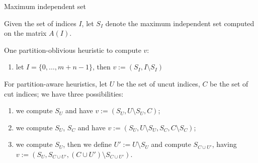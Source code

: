 \begin{frame}{Maximum independent set}

	Given the set of indices $I$, let $S_I$ denote the maximum independent set computed on the matrix $A(I)$.

	One partition-oblivious heuristic to compute $v$: 

	\begin{enumerate}
		\item let $I = \{0,\dots,m+n-1\}$, then $v := (S_I,I \setminus S_I)$
	\end{enumerate}


	For partition-aware heuristics, let $U$ be the set of uncut indices, $C$ be the set of cut indices; we have three possibilities:

	\begin{enumerate}
	\item we compute $S_U$ and have $v := (S_U,U \setminus S_U, C)$;
	\item we compute $S_U$, $S_C$ and have $v := (S_U, U \setminus S_U, S_C, C \setminus S_C)$;
	\item we compute $S_U$, then we define $U' := U \setminus S_U$ and compute $S_{C \cup U'}$, having $v:= (S_U, S_{C \cup U'}, (C \cup U') \setminus S_{C \cup U'})$.

	\end{enumerate}
\end{frame}


